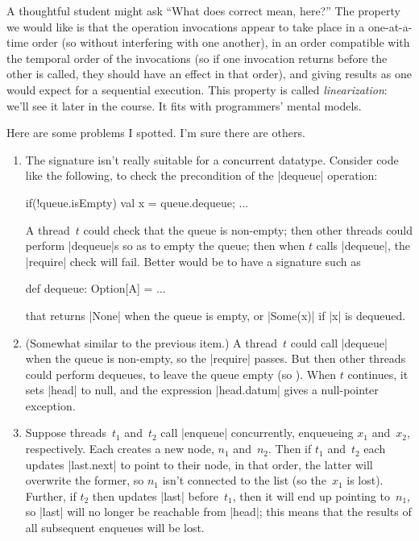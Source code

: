 \begin{answer}
A thoughtful student might ask ``What does correct mean, here?''  The property
we would like is that the operation invocations appear to take place in a
one-at-a-time order (so without interfering with one another), in an order
compatible with the temporal order of the invocations (so if one invocation
returns before the other is called, they should have an effect in that order),
and giving results as one would expect for a sequential execution.  This
property is called \emph{linearization}: we'll see it later in the course.  It
fits with programmers' mental models. 

Here are some problems I spotted.  I'm sure there are others.
\begin{enumerate}
\item
The signature isn't really suitable for a concurrent datatype.  Consider code
like the following, to check the precondition of the |dequeue| operation:
%
\begin{scala}
  if(!queue.isEmpty){ val x = queue.dequeue; ... }
\end{scala}
%
A thread~$t$ could check that the queue is non-empty; then other threads could
perform |dequeue|s so as to empty the queue; then when $t$ calls |dequeue|,
the |require| check will fail.  Better would be to have a signature such as
\begin{scala}
  def dequeue: Option[A] = ...
\end{scala}
that returns |None| when the queue is empty, or |Some(x)| if |x| is dequeued.


\item (Somewhat similar to the previous item.)  A thread~$t$ could call
  |dequeue| when the queue is non-empty, so the |require| passes.  But then
  other threads could perform dequeues, to leave the queue empty (so
  ).  When $t$ continues, it sets |head| to null, and
  the expression |head.datum| gives a null-pointer exception.


\item Suppose threads~$t_1$ and~$t_2$ call |enqueue| concurrently, enqueueing
  $x_1$ and~$x_2$, respectively.  Each creates a new node, $n_1$ and~$n_2$.
  Then if $t_1$ and~$t_2$ each updates |last.next| to point to their node, in
  that order, the latter will overwrite the former, so $n_1$ isn't connected
  to the list (so the~$x_1$ is lost).  Further, if $t_2$ then updates |last|
  before~$t_1$, then it will end up pointing to~$n_1$, so |last| will no
  longer be reachable from |head|; this means that the results of all
  subsequent enqueues will be lost.


\end{enumerate}
\end{answer}

